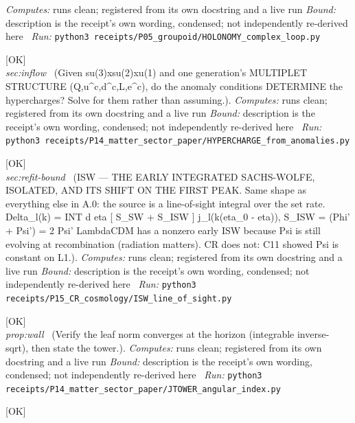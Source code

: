 \begin{description}
\emph{Computes:} runs clean; registered from its own docstring and a live run
 \emph{Bound:} description is the receipt's own wording, condensed; not independently re-derived here
\ \emph{Run:} \texttt{python3 receipts/P05\_groupoid/HOLONOMY\_complex\_loop.py}
\item[\label{rcpt:HYPERCHARGE_from_anomalies}\texttt{HYPERCHARGE\_from\_anomalies}]\hfill\textsf{[OK]}\\
\textit{sec:inflow} \ (Given su(3)xsu(2)xu(1) and one generation's MULTIPLET STRUCTURE (Q,u\textasciicircum{}c,d\textasciicircum{}c,L,e\textasciicircum{}c), do the anomaly conditions DETERMINE the hypercharges? Solve for them rather than assuming.). 
\emph{Computes:} runs clean; registered from its own docstring and a live run
 \emph{Bound:} description is the receipt's own wording, condensed; not independently re-derived here
\ \emph{Run:} \texttt{python3 receipts/P14\_matter\_sector\_paper/HYPERCHARGE\_from\_anomalies.py}
\item[\label{rcpt:ISW_line_of_sight}\texttt{ISW\_line\_of\_sight}]\hfill\textsf{[OK]}\\
\textit{sec:refit-bound} \ (ISW --- THE EARLY INTEGRATED SACHS-WOLFE, ISOLATED, AND ITS SHIFT ON THE FIRST PEAK. Same shape as everything else in A.0: the source is a line-of-sight integral over the set rate. Delta\_l(k) = INT d eta [ S\_SW + S\_ISW ] j\_l(k(eta\_0 - eta)), S\_ISW = (Phi' + Psi') = 2 Psi' LambdaCDM has a nonzero early ISW because Psi is still evolving at recombination (radiation matters). CR does not: C11 showed Psi is constant on L1.). 
\emph{Computes:} runs clean; registered from its own docstring and a live run
 \emph{Bound:} description is the receipt's own wording, condensed; not independently re-derived here
\ \emph{Run:} \texttt{python3 receipts/P15\_CR\_cosmology/ISW\_line\_of\_sight.py}
\item[\label{rcpt:JTOWER_angular_index}\texttt{JTOWER\_angular\_index}]\hfill\textsf{[OK]}\\
\textit{prop:wall} \ (Verify the leaf norm converges at the horizon (integrable inverse-sqrt), then state the tower.). 
\emph{Computes:} runs clean; registered from its own docstring and a live run
 \emph{Bound:} description is the receipt's own wording, condensed; not independently re-derived here
\ \emph{Run:} \texttt{python3 receipts/P14\_matter\_sector\_paper/JTOWER\_angular\_index.py}
\item[\label{rcpt:K1_action_groupoid}\texttt{K1\_action\_groupoid}]\hfill\textsf{[OK]}\\

\end{description}
